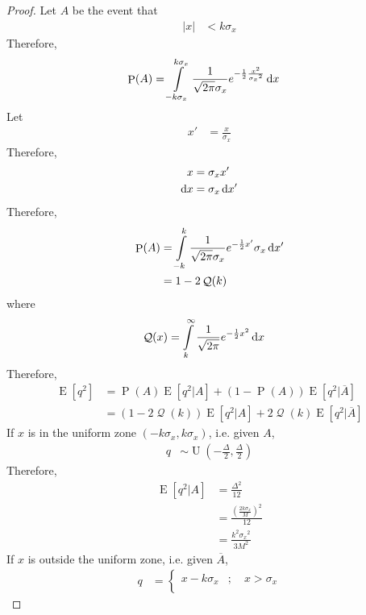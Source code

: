 \documentclass[titlepage, fleqn, a4paper, 12pt, twoside]{article}
\theoremstyle{definition}
\theoremstyle{theorem}
\DeclareMathOperator{\prob}{\mathrm{P}}
\DeclareMathOperator{\expct}{\mathrm{E}}
\DeclareMathOperator{\uniform}{\mathrm{U}}
\DeclareMathOperator{\Q}{\mathcal{Q}}
\begin{document}
\begin{proof}
	Let $A$ be the event that
	\begin{align*}
		|x| &< k \sigma_x
	\end{align*}
	Therefore,
	\begin{align*}
		\prob(A) &= \int\limits_{-k \sigma_x}^{k \sigma_x} \frac{1}{\sqrt{2 \pi} \sigma_x} e^{-\frac{1}{2} \frac{x^2}{{\sigma_x}^2}} \dif x
	\end{align*}
	Let
	\begin{align*}
		x' &= \frac{x}{\sigma_x}
	\end{align*}
	Therefore,
	\begin{align*}
		x &= \sigma_x x'\\
		\dif x &= \sigma_x \dif x'
	\end{align*}
	Therefore,
	\begin{align*}
		\prob(A) &= \int\limits_{-k}^{k} \frac{1}{\sqrt{2 \pi} \sigma_x} e^{-\frac{1}{2} x'} \sigma_x \dif x'\\
		&= 1 - 2 \Q(k)
	\end{align*}
	where
	\begin{align*}
		\Q(x) &= \int\limits_{k}^{\infty} \frac{1}{\sqrt{2 \pi}} e^{-\frac{1}{2} x^2} \dif x
	\end{align*}
	Therefore,
	\begin{align*}
		\expct\left[ q^2 \right] &= \prob(A) \expct\left[ q^2 \Big| A \right] + \left( 1 - \prob(A) \right) \expct\left[ q^2 \Big| \overline{A} \right]\\
		&= \left( 1 - 2 \Q(k) \right) \expct\left[ q^2 \Big| A \right] + 2 \Q(k) \expct\left[ q^2 \Big| \overline{A} \right]
	\end{align*}
	If $x$ is in the uniform zone $(-k \sigma_x,k \sigma_x)$, i.e. given $A$,
	\begin{align*}
		q &\sim \uniform\left( -\frac{\Delta}{2},\frac{\Delta}{2} \right)
	\end{align*}
	Therefore,
	\begin{align*}
		\expct\left[ q^2 \Big| A \right] &= \frac{\Delta^2}{12}\\
		&= \frac{\left( \frac{2 k \sigma_x}{M} \right)^2}{12}\\
		&= \frac{k^2 {\sigma_x}^2}{3 M^2}
	\end{align*}
	If $x$ is outside the uniform zone, i.e. given $\overline{A}$,
	\begin{align*}
		q &=
			\begin{cases}
				x - k \sigma_x &;\quad x > \sigma_x\\

\end{cases}
\end{align*}
\end{proof}
\end{document}
